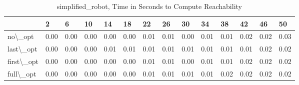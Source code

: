 \begin{table}
\centering
\caption{simplified\_robot, Time in Seconds to Compute Reachability}
\label{simplified_robot_states_time}
\begin{tabular}{llllllllllllll}
\toprule
{} &     2 &     6 &    10 &    14 &    18 &    22 &    26 &    30 &    34 &    38 &    42 &    46 &    50 \\
\midrule
no\textbackslash \_opt    &  0.00 &  0.00 &  0.00 &  0.00 &  0.00 &  0.01 &  0.01 &  0.00 &  0.01 &  0.01 &  0.02 &  0.02 &  0.03 \\
last\textbackslash \_opt  &  0.00 &  0.00 &  0.00 &  0.01 &  0.01 &  0.01 &  0.01 &  0.01 &  0.01 &  0.01 &  0.01 &  0.02 &  0.02 \\
first\textbackslash \_opt &  0.00 &  0.00 &  0.00 &  0.00 &  0.00 &  0.01 &  0.01 &  0.00 &  0.01 &  0.01 &  0.02 &  0.02 &  0.02 \\
full\textbackslash \_opt  &  0.00 &  0.00 &  0.00 &  0.00 &  0.00 &  0.01 &  0.01 &  0.01 &  0.01 &  0.02 &  0.02 &  0.02 &  0.02 \\
\bottomrule
\end{tabular}
\end{table}

